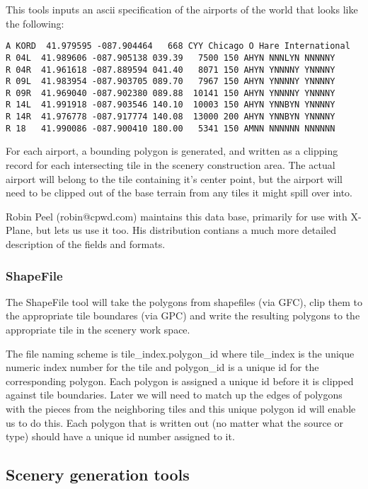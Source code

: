 \documentclass[12pt]{article}
\begin{document}
This tools inputs an ascii specification of the airports of the world
that looks like the following:

\begin{verbatim}
A KORD  41.979595 -087.904464   668 CYY Chicago O Hare International
R 04L  41.989606 -087.905138 039.39   7500 150 AHYN NNNLYN NNNNNY
R 04R  41.961618 -087.889594 041.40   8071 150 AHYN YNNNNY YNNNNY
R 09L  41.983954 -087.903705 089.70   7967 150 AHYN YNNNNY YNNNNY
R 09R  41.969040 -087.902380 089.88  10141 150 AHYN YNNNNY YNNNNY
R 14L  41.991918 -087.903546 140.10  10003 150 AHYN YNNBYN YNNNNY
R 14R  41.976778 -087.917774 140.08  13000 200 AHYN YNNBYN YNNNNY
R 18   41.990086 -087.900410 180.00   5341 150 AMNN NNNNNN NNNNNN
\end{verbatim}

For each airport, a bounding polygon is generated, and written as a
clipping record for each intersecting tile in the scenery construction
area.  The actual airport will belong to the tile containing it's
center point, but the airport will need to be clipped out of the base
terrain from any tiles it might spill over into.

Robin Peel (robin@cpwd.com) maintains this data base, primarily for
use with X-Plane, but lets us use it too.  His distribution contians a
much more detailed description of the fields and formats.

\subsubsection{ShapeFile}

The ShapeFile tool will take the polygons from shapefiles (via GFC),
clip them to the appropriate tile boundares (via GPC) and write the
resulting polygons to the appropriate tile in the scenery work space.

The file naming scheme is tile\_index.polygon\_id where tile\_index is
the unique numeric index number for the tile and polygon\_id is a
unique id for the corresponding polygon.  Each polygon is assigned a
unique id before it is clipped against tile boundaries.  Later we will
need to match up the edges of polygons with the pieces from the
neighboring tiles and this unique polygon id will enable us to do
this.  Each polygon that is written out (no matter what the source or
type) should have a unique id number assigned to it.

\subsection{Scenery generation tools}
\end{document}
